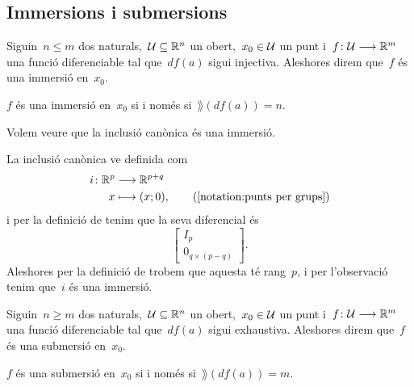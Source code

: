 \documentclass[../../main.tex]{subfiles}
\begin{document}
	\subsection{Immersions i submersions}
	\begin{definition}[Immersió]
		\label{def:immersió}
		Siguin~\(n\leq m\) dos naturals,~\(\mathcal{U}\subseteq\mathbb{R}^{n}\) un obert,~\(x_{0}\in\mathcal{U}\) un punt i~\(f\colon\mathcal{U}\longrightarrow\mathbb{R}^{m}\) una funció diferenciable tal que~\(df(a)\) sigui injectiva.
		Aleshores direm que~\(f\) és una immersió en~\(x_{0}\).
	\end{definition}
	\begin{observation} %
		\label{obs:immersió si i només si té rang maximal}
		\(f\) és una immersió en~\(x_{0}\) si i només si~\(\rang(df(a))=n\).
	\end{observation}
	\begin{example}
		\label{ex:la inclusió canònica és una immersió}
		Volem veure que la inclusió canònica és una immersió.
		\begin{solution}
			La inclusió canònica ve definida com
			\begin{align*}
				i\colon\mathbb{R}^{p}&\longrightarrow\mathbb{R}^{p+q} \\
				x&\longmapsto(x;0), \tag{\ref{notation:punts per grups}}
			\end{align*}
			i per la definició de  tenim que la seva diferencial és
			\[\left[\begin{array}{c}
				I_{p} \\\hline
				0_{q\times(p-q)}
			\end{array}\right].\]
			Aleshores per la definició de  trobem que aquesta té rang~\(p\), i per l'observació  tenim que~\(i\) és una immersió.
		\end{solution}
	\end{example}
	\begin{definition}[Submersió]
		\label{def:submersió}
		Siguin~\(n\geq m\) dos naturals,~\(\mathcal{U}\subseteq\mathbb{R}^{n}\) un obert,~\(x_{0}\in\mathcal{U}\) un punt i~\(f\colon\mathcal{U}\longrightarrow\mathbb{R}^{m}\) una funció diferenciable tal que~\(df(a)\) sigui exhaustiva.
		Aleshores direm que~\(f\) és una submersió en~\(x_{0}\).
	\end{definition}
	\begin{observation}
		\label{obs:submersió si i només si té rang més petit o igual}
		\(f\) és una submersió en~\(x_{0}\) si i només si~\(\rang(df(a))=m\).
	\end{observation}
\end{document}

